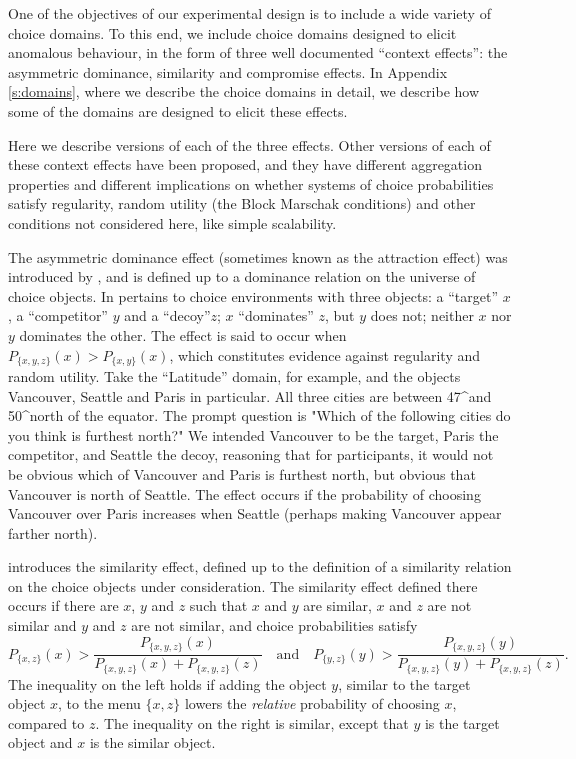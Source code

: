 \documentclass[11pt,letter]{article}
\newcommand{\menu}{menu}
\newcommand{\bin}[2]{P_{\{#1,#2\}}(#1)}
\begin{document}
One of the objectives of our experimental design is to include a wide variety of choice domains.
To this end, we include choice domains designed to elicit anomalous behaviour, in the form of three well documented ``context effects'': the asymmetric dominance, similarity and compromise effects.
In Appendix \ref{s:domains}, where we describe the choice domains in detail, we describe how some of the domains are designed to elicit these effects.

Here we describe versions of each of the three effects.
Other versions of each of these context effects have been proposed, and they have different aggregation properties and different implications on whether systems of choice probabilities satisfy regularity, random utility (the Block Marschak conditions) and other conditions not considered here, like  simple scalability.

The asymmetric dominance effect (sometimes known as the attraction effect) was introduced by , and is defined up to a dominance relation on the universe of choice objects.
In pertains to choice environments with three objects: a ``target'' $x$, a ``competitor'' $y$ and a ``decoy''$z$; $x$ ``dominates'' $z$, but $y$ does not; neither $x$ nor $y$ dominates the other.
The effect is said to occur when $P_{\{x,y,z\}}(x) > \bin{x}{y}$, which constitutes evidence against regularity and random utility.
Take the ``Latitude'' domain, for example, and the objects Vancouver, Seattle and Paris in particular.
All three cities are between 47^\circ and 50^\circ north of the equator.
The prompt question is "Which of the following cities do you think is furthest north?"
We intended Vancouver to be the target, Paris the competitor, and Seattle the decoy, reasoning that for participants, it would not be obvious which of Vancouver and Paris is furthest north, but obvious that Vancouver is north of Seattle.
The effect occurs if the probability of choosing Vancouver over Paris increases when Seattle (perhaps making Vancouver appear farther north).

 introduces the similarity effect, defined up to the definition of a similarity relation on the choice objects under consideration.
The similarity effect defined there occurs if there are $x$, $y$ and $z$ such that $x$ and $y$ are similar, $x$ and $z$ are not similar and $y$ and $z$ are not similar, and choice probabilities satisfy
\[
	\bin{x}{z} > \frac{P_{\{x,y,z\}}(x)}{P_{\{x,y,z\}}(x) + P_{\{x,y,z\}}(z)}
	\quad \mbox{and} \quad
	\bin{y}{z} > \frac{P_{\{x,y,z\}}(y)}{P_{\{x,y,z\}}(y) + P_{\{x,y,z\}}(z)}.
\]
The inequality on the left holds if adding the object $y$, similar to the target object $x$, to the \menu{} $\{x,z\}$ lowers the {\em relative} probability of choosing $x$, compared to $z$.
The inequality on the right is similar, except that $y$ is the target object and $x$ is the similar object.
\end{document}
